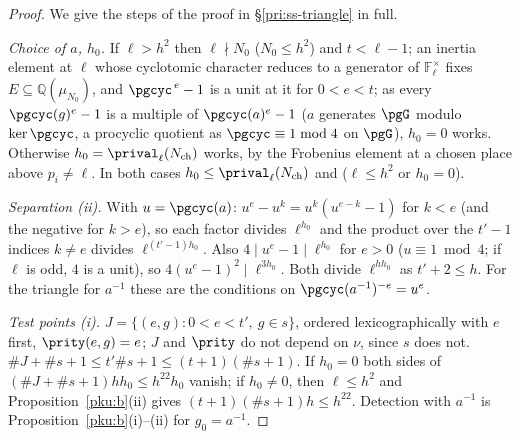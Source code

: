 \documentclass[10pt]{amsart}
\theoremstyle{definition}
\theoremstyle{remark}
\newcommand{\Q}{\mathbb Q}
\begin{document}
\begin{proof}
We give the steps of the proof in \S\ref{pri:ss-triangle} in full.

\emph{Choice of $a$, $h_0$.} If $\ell>h^2$ then $\ell\nmid N_0$ ($N_0\le h^2$) and $t<\ell-1$; an inertia
element at $\ell$ whose cyclotomic character reduces to a generator of $\mathbb F_\ell^\times$ fixes
$E\subseteq\Q(\mu_{N_0})$, and $\pgcyc^{\,e}-1$ is a unit at it for $0<e<t$; as every $\pgcyc(g)^e-1$ is
a multiple of $\pgcyc(a)^e-1$ ($a$ generates $\pgG$ modulo $\ker\pgcyc$, a procyclic quotient as
$\pgcyc\equiv1\bmod4$ on $\pgG$), $h_0=0$ works. Otherwise $h_0=\prival_\ell(N_{\mathrm{ch}})$ works,
by the Frobenius element at a chosen place above $p_i\ne\ell$. In both cases $h_0\le\prival_\ell(
N_{\mathrm{ch}})$ and ($\ell\le h^2$ or $h_0=0$).

\emph{Separation (ii).} With $u=\pgcyc(a)$: $u^e-u^k=u^k(u^{e-k}-1)$ for $k<e$ (and the negative for
$k>e$), so each factor divides $\ell^{h_0}$ and the product over the $t'-1$ indices $k\ne e$ divides
$\ell^{(t'-1)h_0}$. Also $4\mid u^e-1\mid\ell^{h_0}$ for $e>0$ ($u\equiv1\bmod4$; if $\ell$ is odd,
$4$ is a unit), so $4(u^e-1)^2\mid\ell^{3h_0}$. Both divide $\ell^{hh_0}$ as $t'+2\le h$. For the
triangle for $a^{-1}$ these are the conditions on $\pgcyc(a^{-1})^{-e}=u^e$.

\emph{Test points (i).} $J=\{(e,g):0<e<t',\ g\in s\}$, ordered lexicographically with $e$ first,
$\prity(e,g)=e$; $J$ and $\prity$ do not depend on $\nu$, since $s$ does not. $\#J+\#s+1\le
t'\#s+1\le(t+1)(\#s+1)$. If $h_0=0$ both sides of $(\#J+\#s+1)hh_0\le h^{22}h_0$ vanish; if $h_0\ne0$,
then $\ell\le h^2$ and Proposition~\ref{pku:b}(ii) gives $(t+1)(\#s+1)h\le h^{22}$. Detection with
$a^{-1}$ is Proposition~\ref{pku:b}(i)--(ii) for $g_0=a^{-1}$.


\end{proof}
\end{document}
